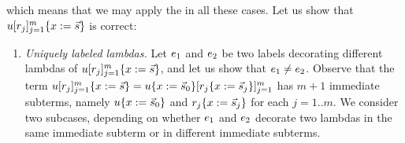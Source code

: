 \begin{enumerate}
\begin{enumerate}
      which means that we may apply the \ih in all these cases.
      Let us show that $u[r_j]_{j=1}^m\{x := \vec{s}\}$ is correct:
      \begin{enumerate}
      \item {\em Uniquely labeled lambdas.}
        Let $e_1$ and $e_2$ be two labels decorating different lambdas of
        $u[r_j]_{j=1}^m\{x := \vec{s}\}$, and let us show that $e_1 \neq e_2$.
        Observe that the term
        $u[r_j]_{j=1}^m\{x := \vec{s}\} =
         u\{x := \vec{s}_0\}[r_j\{x := \vec{s}_j\}]_{j=1}^m$
        has $m + 1$ immediate subterms, namely
        $u\{x := \vec{s}_0\}$
        and $r_j\{x := \vec{s}_j\}$ for each $j=1..m$.
        We consider two subcases, depending on whether $e_1$ and $e_2$
        decorate two lambdas in the same immediate subterm or in different immediate subterms.


\end{enumerate}
\end{enumerate}
\end{enumerate}
